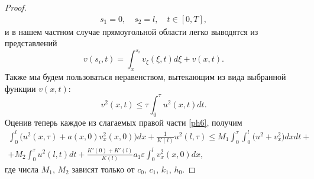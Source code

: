 \begin{proof}
\begin{gather}
s_1=0, \quad  s_2=l, \quad  t\in [0, T],
\end{gather}
и в нашем частном случае
прямоугольной области легко выводятся из представлений
$$v(s_i,t)= \int _x^{s_i}v_{\xi}(\xi,t)d\xi +v(x,t). $$
Также мы будем пользоваться неравенством, вытекающим из вида выбранной функции $v(x,t):$
$$
v^2(x,t)\leq \tau  \int _0^{\tau}u^2(x,t)dt.
$$
Оценив теперь каждое из слагаемых правой части \eqref{ph6}, 
получим
\begin{multline}
\int _0^l \bigl( u^2(x, \tau)+a(x, 0)v^2_x(x, 0) \bigr)dx+
\frac{1}{K(l)}u^2(l,\tau)\leq M_1 \int _0^{\tau} \int _0^l \bigl(u^2+v_x^2 \bigr)dxdt+
\\
 \label{sav:eq8}
+M_2 \int _0^{\tau}u^2(l, t)dt+ \frac{K'(0)+K'(l)}{K(l)}a_1\varepsilon  \int _0^lv_x^2(x, 0)dx,
\end{multline}
где числа $M_1$, $M_2$ зависят только от $c_0$, $c_1$, $k_1$, $h_0.$ 



\end{proof}
